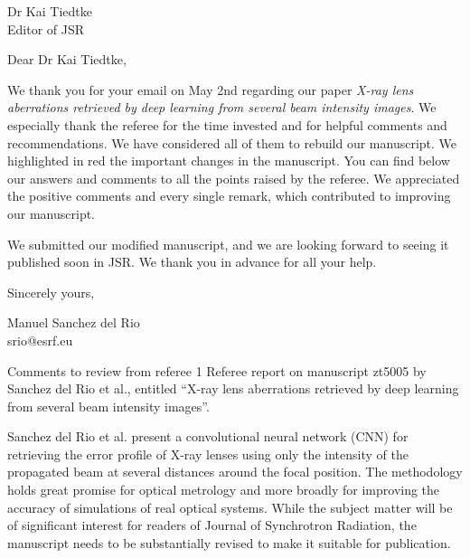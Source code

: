 \documentclass[11pt]{letter} %
\begin{document}
 

\begin{letter}{} %

Dr Kai Tiedtke\\
Editor of JSR\\

\opening{Dear Dr Kai Tiedtke,}

We thank you for your email on May 2nd regarding our paper \textit{X-ray lens aberrations retrieved by deep learning from several beam intensity images}. We especially thank the referee for the time invested and for helpful comments and recommendations. We have considered all of them to rebuild our manuscript. We highlighted in red the important changes in the manuscript. You can find below our answers and comments to all the points raised by the referee. We appreciated the positive comments and every single remark, which contributed to improving our manuscript. 

We submitted our modified manuscript, and we are looking forward to seeing it published soon in JSR. We thank you in advance for all your help.


\closing{Sincerely yours,}



Manuel Sanchez del Rio\\srio@esrf.eu



\newpage


Comments to review from referee 1
Referee report on manuscript zt5005 by Sanchez del Rio et al., entitled “X-ray lens aberrations retrieved by deep learning from several beam intensity images”.

Sanchez del Rio et al. present a convolutional neural network (CNN) for retrieving the error profile of X-ray lenses using only the intensity of the propagated beam at several distances around the focal position. The methodology holds great promise for optical metrology and more broadly for improving the accuracy of simulations of real optical systems. While the subject matter will be of significant interest for readers of Journal of Synchrotron Radiation, the manuscript needs to be substantially revised to make it suitable for publication.


\end{letter}
\end{document}
